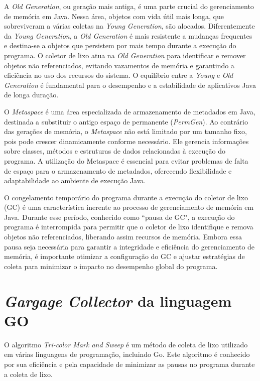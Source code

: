 \documentclass{article}
\begin{document}
    A \emph{Old Generation}, ou geração mais antiga, é uma parte crucial do gerenciamento de memória em Java. Nessa área,
    objetos com vida útil mais longa, que sobreviveram a várias coletas na \emph{Young Generation}, são alocados.
    Diferentemente da \emph{Young Generation}, a \emph{Old Generation} é mais resistente a mudanças frequentes e destina-se a
    objetos que persistem por mais tempo durante a execução do programa. O coletor de lixo atua na \emph{Old Generation}
    para identificar e remover objetos não referenciados, evitando vazamentos de memória e garantindo a eficiência
    no uso dos recursos do sistema. O equilíbrio entre a \emph{Young} e \emph{Old Generation} é fundamental para o desempenho e a
    estabilidade de aplicativos Java de longa duração.

    O \emph{Metaspace} é uma área especializada de armazenamento de metadados em Java, destinada a substituir o
    antigo espaço de permanente (\emph{PermGen}). Ao contrário das gerações de memória, o \emph{Metaspace} não está limitado por
    um tamanho fixo, pois pode crescer dinamicamente conforme necessário. Ele gerencia informações sobre classes,
    métodos e estruturas de dados relacionadas à execução do programa. A utilização do Metaspace é essencial para
    evitar problemas de falta de espaço para o armazenamento de metadados, oferecendo flexibilidade e adaptabilidade
    ao ambiente de execução Java.

    O congelamento temporário do programa durante a execução do coletor de lixo (GC) é uma característica inerente
    ao processo de gerenciamento de memória em Java. Durante esse período, conhecido como ``pausa de GC", a
    execução do programa é interrompida para permitir que o coletor de lixo identifique e remova objetos não
    referenciados, liberando assim recursos de memória. Embora essa pausa seja necessária para garantir a integridade
    e eficiência do gerenciamento de memória, é importante otimizar a configuração do GC e ajustar estratégias de
    coleta para minimizar o impacto no desempenho global do programa.

    \section*{\emph{Gargage Collector} da linguagem GO}

    O algoritmo \textit{Tri-color Mark and Sweep} é um método de coleta de lixo utilizado em várias linguagens de programação,
    incluindo Go. Este algoritmo é conhecido por sua eficiência e pela capacidade de minimizar as pausas no programa durante a coleta de lixo.
\end{document}
